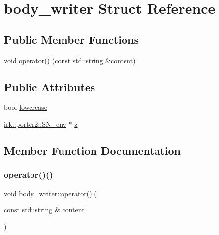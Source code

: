 \hypertarget{structbody__writer}{}\section{body\+\_\+writer Struct Reference}
\label{structbody__writer}
\subsection*{Public Member Functions}
\begin{DoxyCompactItemize}
\item 
void \mbox{\hyperlink{structbody__writer_a6050dfcfb3991a16c29775c3f1fcba81}{operator()}} (const std\+::string \&content)
\end{DoxyCompactItemize}
\subsection*{Public Attributes}
\begin{DoxyCompactItemize}
\item 
bool \mbox{\hyperlink{structbody__writer_a6df150a131f73f0174993cf6c496312f}{lowercase}}
\item 
\mbox{\hyperlink{structirk_1_1porter2_1_1SN__env}{irk\+::porter2\+::\+S\+N\+\_\+env}} $\ast$ \mbox{\hyperlink{structbody__writer_a4bf261cc5299b2eae268e0ed61bb17d6}{z}}
\end{DoxyCompactItemize}


\subsection{Member Function Documentation}
\mbox{\label{structbody__writer_a6050dfcfb3991a16c29775c3f1fcba81}} 
\subsubsection{\texorpdfstring{operator()()}{operator()()}}
{\footnotesize\ttfamily void body\+\_\+writer\+::operator() (\begin{DoxyParamCaption}\item[{const std\+::string \&}]{content }\end{DoxyParamCaption})\hspace{0.3cm}{\ttfamily [inline]}}



